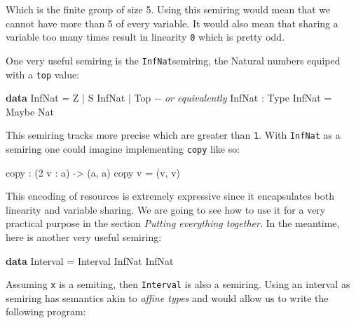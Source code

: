 \documentclass[
]{article}
\newenvironment{Shaded}{}{}
\newcommand{\CommentTok}[1]{\textcolor[rgb]{0.38,0.63,0.69}{\textit{#1}}}
\newcommand{\DataTypeTok}[1]{\textcolor[rgb]{0.56,0.13,0.00}{#1}}
\newcommand{\DecValTok}[1]{\textcolor[rgb]{0.25,0.63,0.44}{#1}}
\newcommand{\KeywordTok}[1]{\textcolor[rgb]{0.00,0.44,0.13}{\textbf{#1}}}
\newcommand{\NormalTok}[1]{#1}
\newcommand{\OperatorTok}[1]{\textcolor[rgb]{0.40,0.40,0.40}{#1}}
\newcommand{\OtherTok}[1]{\textcolor[rgb]{0.00,0.44,0.13}{#1}}
\begin{document}
Which is the finite group of size 5. Using this semiring would mean that
we cannot have more than 5 of every variable. It would also mean that
sharing a variable too many times result in linearity \texttt{0} which
is pretty odd.

One very useful semiring is the \texttt{InfNat}semiring, the Natural
numbers equiped with a \texttt{top} value:

\begin{Shaded}
\begin{Highlighting}[]
\KeywordTok{data} \DataTypeTok{InfNat} \OtherTok{=} \DataTypeTok{Z} \OperatorTok{|} \DataTypeTok{S} \DataTypeTok{InfNat} \OperatorTok{|} \DataTypeTok{Top}
\CommentTok{{-}{-} or equivalently}
\DataTypeTok{InfNat} \OperatorTok{:} \DataTypeTok{Type}
\DataTypeTok{InfNat} \OtherTok{=} \DataTypeTok{Maybe} \DataTypeTok{Nat}
\end{Highlighting}
\end{Shaded}

This semiring tracks more precise which are greater than \texttt{1}.
With \texttt{InfNat} as a semiring one could imagine implementing
\texttt{copy} like so:

\begin{Shaded}
\begin{Highlighting}[]
\NormalTok{copy }\OperatorTok{:}\NormalTok{ (}\DecValTok{2}\NormalTok{ v }\OperatorTok{:}\NormalTok{ a) }\OtherTok{{-}\textgreater{}}\NormalTok{ (a, a)}
\NormalTok{copy v }\OtherTok{=}\NormalTok{ (v, v)}
\end{Highlighting}
\end{Shaded}

This encoding of resources is extremely expressive since it encapsulates
both linearity and variable sharing. We are going to see how to use it
for a very practical purpose in the section \emph{Putting everything
together}. In the meantime, here is another very useful semiring:

\begin{Shaded}
\begin{Highlighting}[]
\KeywordTok{data} \DataTypeTok{Interval} \OtherTok{=} \DataTypeTok{Interval} \DataTypeTok{InfNat} \DataTypeTok{InfNat}
\end{Highlighting}
\end{Shaded}

Assuming \texttt{x} is a semiting, then \texttt{Interval} is also a
semiring. Using an interval as semiring has semantics akin to
\emph{affine types} and would allow us to write the following program:
\end{document}
